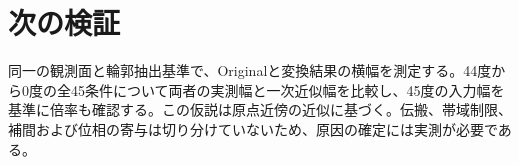 \documentclass[a4paper,10pt]{ltjsarticle}
\begin{document}
\section{次の検証}
同一の観測面と輪郭抽出基準で、Originalと変換結果の横幅を測定する。44度から0度の全45条件について両者の実測幅と一次近似幅を比較し、45度の入力幅を基準に倍率も確認する。この仮説は原点近傍の近似に基づく。伝搬、帯域制限、補間および位相の寄与は切り分けていないため、原因の確定には実測が必要である。
\end{document}
